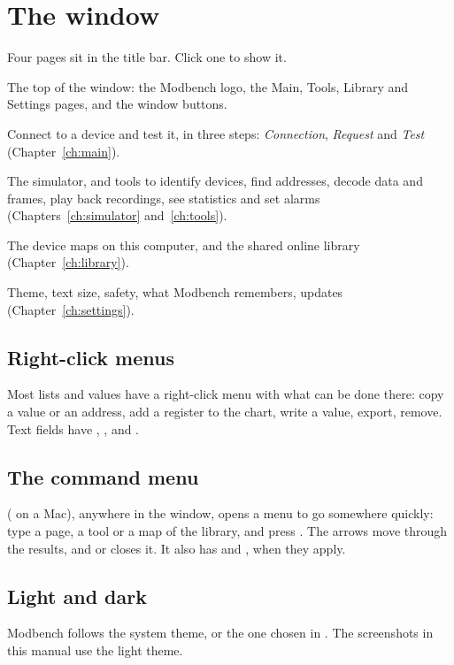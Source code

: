\section{The window}
\label{sec:window}

Four pages sit in the title bar. Click one to show it.

  {The top of the window: the Modbench logo, the Main, Tools, Library and
   Settings pages, and the window buttons.}

\begin{description}[style=nextline, leftmargin=0pt, font=\intermedium]
  \item[Main] Connect to a device and test it, in three steps: \emph{Connection},
    \emph{Request} and \emph{Test} (Chapter~\ref{ch:main}).
  \item[Tools] The simulator, and tools to identify devices, find addresses,
    decode data and frames, play back recordings, see statistics and set
    alarms (Chapters~\ref{ch:simulator} and~\ref{ch:tools}).
  \item[Library] The device maps on this computer, and the shared online
    library (Chapter~\ref{ch:library}).
  \item[Settings] Theme, text size, safety, what Modbench remembers, updates
    (Chapter~\ref{ch:settings}).
\end{description}

\subsection{Right-click menus}

Most lists and values have a right-click menu with what can be done there:
copy a value or an address, add a register to the chart, write a value, export,
remove. Text fields have , ,  and
.

\subsection{The command menu}

 ( on a Mac), anywhere in the window, opens a menu to go
somewhere quickly: type a page, a tool or a map of the library, and press
. The arrows move through the results, and  or
 closes it. It also has  and ,
when they apply.

\subsection{Light and dark}

Modbench follows the system theme, or the one chosen in
. The screenshots in this manual use the light
theme.
